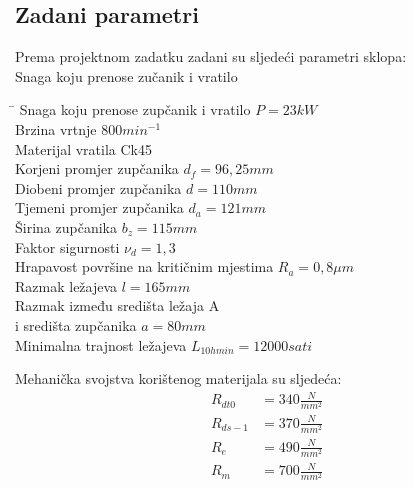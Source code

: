 \documentclass[11pt,a4paper]{article}
\begin{document}
\subsection{Zadani parametri}
Prema projektnom zadatku zadani su sljedeći parametri sklopa:\\
Snaga koju prenose zučanik i vratilo
\begin{tabbing}
\hspace{260pt}\=\kill
 Snaga koju prenose zupčanik i vratilo \> $P=23 kW$ \\ 
 Brzina vrtnje \> $800 min^{-1}$ \\ 
 Materijal vratila \> Ck45 \\
 Korjeni promjer zupčanika \> $d_f=96,25mm$ \\ 
 Diobeni promjer zupčanika \> $d=110mm$ \\ 
 Tjemeni promjer zupčanika \> $d_a=121mm$ \\ 
 Širina zupčanika \> $b_z=115mm$ \\ 
 Faktor sigurnosti \> $\nu_d=1,3$ \\ 
 Hrapavost površine na kritičnim mjestima \> $R_a=0,8\mu m$ \\ 
 Razmak ležajeva \> $l=165mm$ \\ 
 Razmak između središta ležaja A\\ i središta zupčanika \> $a=80mm$ \\ 
 Minimalna trajnost ležajeva \> $L_{10h min}=12000 sati$
\end{tabbing}
Mehanička svojstva korištenog materijala su sljedeća:\\
\begin{align*}
R_{dt0}&=340 \textstyle\frac{N}{mm^2}\\
R_{ds-1}&=370 \textstyle\frac{N}{mm^2}\\
R_e&=490 \textstyle\frac{N}{mm^2}\\
R_m&=700 \textstyle\frac{N}{mm^2}
\end{align*}
 
\end{document}
